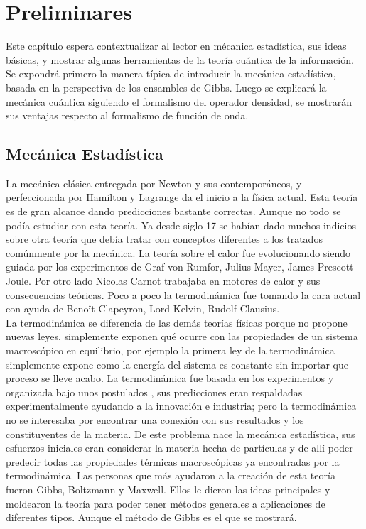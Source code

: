 \chapter{Preliminares}

Este capítulo espera contextualizar al lector en mécanica estadística, sus ideas básicas, y mostrar algunas herramientas de la teoría cuántica de la información. Se expondrá  primero la manera típica de introducir la mecánica estadística, basada en la perspectiva de los ensambles de Gibbs. Luego se explicará la mecánica cuántica siguiendo el formalismo del operador densidad, se mostrarán sus ventajas respecto al formalismo de función de onda.


\section{Mecánica Estadística}
La mecánica clásica entregada por Newton y sus contemporáneos, y perfeccionada por Hamilton y Lagrange da el inicio a la física actual. Esta teoría es de gran alcance dando predicciones bastante correctas. Aunque no todo se podía estudiar con esta teoría. Ya desde siglo 17 se habían dado muchos indicios sobre otra teoría que debía tratar con conceptos diferentes a los tratados comúnmente por la mecánica. La teoría sobre el calor fue evolucionando siendo guiada por los experimentos de Graf von Rumfor, Julius Mayer, James Prescott Joule. Por otro lado Nicolas Carnot trabajaba en motores de calor y sus consecuencias teóricas. Poco a poco la termodinámica fue tomando la cara actual con ayuda de Benoît Clapeyron, Lord Kelvin, Rudolf Clausius. 
\\
La termodinámica se diferencia de las demás teorías físicas porque no propone nuevas leyes, simplemente exponen qué ocurre con las propiedades de un sistema macroscópico en equilibrio, por ejemplo la primera ley de la termodinámica simplemente expone como la energía del sistema es constante sin importar que proceso se lleve acabo. La termodinámica fue basada en los experimentos y organizada bajo unos postulados \cite{CallenThermo}, sus predicciones eran respaldadas experimentalmente ayudando a la innovación e industria; pero la termodinámica no se interesaba por encontrar una conexión con sus resultados y los constituyentes de la materia. De este problema nace la mecánica estadística, sus esfuerzos iniciales eran considerar la materia hecha de partículas y de allí poder predecir todas las propiedades térmicas macroscópicas ya encontradas por la termodinámica. Las personas que más ayudaron a la creación de esta teoría fueron Gibbs, Boltzmann y Maxwell. Ellos le dieron las ideas principales y moldearon la teoría para poder tener métodos generales a aplicaciones de diferentes tipos. Aunque el método de Gibbs es el que se mostrará.

